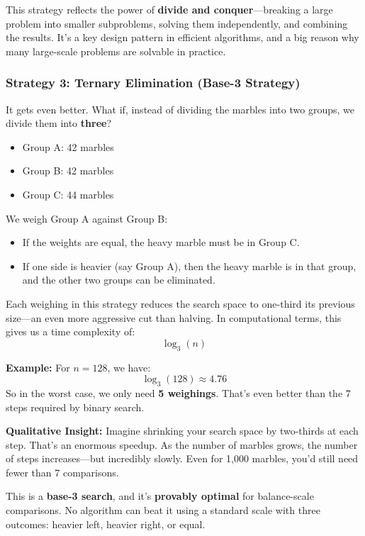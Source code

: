 \medskip

This strategy reflects the power of \textbf{divide and conquer}—breaking a large problem into smaller subproblems, solving them independently, and combining the results. It’s a key design pattern in efficient algorithms, and a big reason why many large-scale problems are solvable in practice.

\subsubsection{Strategy 3: Ternary Elimination (Base-3 Strategy)}

It gets even better. What if, instead of dividing the marbles into two groups, we divide them into \textbf{three}?

\begin{itemize}
  \item Group A: 42 marbles
  \item Group B: 42 marbles
  \item Group C: 44 marbles
\end{itemize}

We weigh Group A against Group B:
\begin{itemize}
  \item If the weights are equal, the heavy marble must be in Group C.
  \item If one side is heavier (say Group A), then the heavy marble is in that group, and the other two groups can be eliminated.
\end{itemize}

Each weighing in this strategy reduces the search space to one-third its previous size—an even more aggressive cut than halving. In computational terms, this gives us a time complexity of:
\[
\log_3(n)
\]

\medskip

\noindent\textbf{Example:} For \( n = 128 \), we have:
\[
\log_3(128) \approx 4.76
\]
So in the worst case, we only need \textbf{5 weighings}. That’s even better than the 7 steps required by binary search.

\medskip

\noindent\textbf{Qualitative Insight:} Imagine shrinking your search space by two-thirds at each step. That’s an enormous speedup. As the number of marbles grows, the number of steps increases—but incredibly slowly. Even for 1,000 marbles, you’d still need fewer than 7 comparisons.

This is a \textbf{base-3 search}, and it’s \textbf{provably optimal} for balance-scale comparisons. No algorithm can beat it using a standard scale with three outcomes: heavier left, heavier right, or equal.


